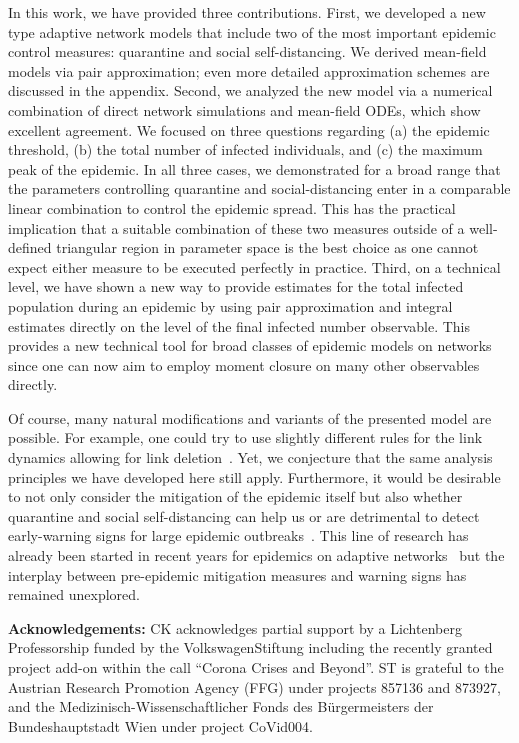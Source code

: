 \documentclass[12pt]{article}
\begin{document}
In this work, we have provided three contributions. First, we developed a new type adaptive network models that include two of the most important epidemic control measures: quarantine and social self-distancing. We derived mean-field models via pair approximation; even more detailed approximation schemes are discussed in the appendix. Second, we analyzed the new model via a numerical combination of direct network simulations and mean-field ODEs, which show excellent agreement. We focused on three questions regarding (a) the epidemic threshold, (b) the total number of infected individuals, and (c) the maximum peak of the epidemic. In all three cases, we demonstrated for a broad range that the parameters controlling quarantine and social-distancing enter in a comparable linear combination to control the epidemic spread. This has the practical implication that a suitable combination of these two measures outside of a well-defined triangular region in parameter space is the best choice as one cannot expect either measure to be executed perfectly in practice. Third, on a technical level, we have shown a new way to provide estimates for the total infected population during an epidemic by using pair approximation and integral estimates directly on the level of the final infected number observable. This provides a new technical tool for broad classes of epidemic models on networks since one can now aim to employ moment closure on many other observables directly.\medskip

Of course, many natural modifications and variants of the presented model are possible. For example, one could try to use slightly different rules for the link dynamics allowing for link deletion~\cite{Balletal,TuncShkarayev}. Yet, we conjecture that the same analysis principles we have developed here still apply. Furthermore, it would be desirable to not only consider the mitigation of the epidemic itself but also whether quarantine and social self-distancing can help us or are detrimental to detect early-warning signs for large epidemic outbreaks~\cite{OReganDrake,WidderKuehn,Brettetal}. This line of research has already been started in recent years for epidemics on adaptive networks~\cite{KuehnZschalerGross,HorstmeyerKuehnThurner} but the interplay between pre-epidemic mitigation measures and warning signs has remained unexplored.\medskip 

\textbf{Acknowledgements:} CK acknowledges partial support by a Lichtenberg Professorship funded by the VolkswagenStiftung including the recently granted project add-on within the call ``Corona Crises and Beyond''. ST is grateful to the Austrian Research Promotion Agency (FFG) under projects 857136 and 873927, and the Medizinisch-Wissenschaftlicher Fonds des B\"urgermeisters der Bundeshauptstadt Wien under project CoVid004. 
\end{document}
